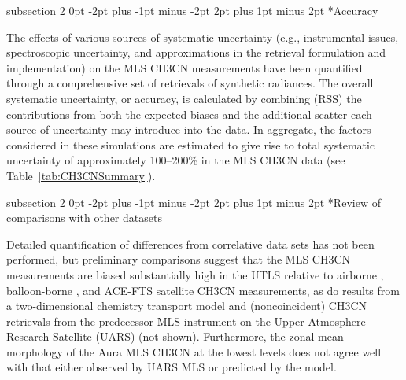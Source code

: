\documentclass[11pt,draft]{report}
\makeatletter
\renewcommand{\subsection}{\@startsection%
  {subsection}%
  {2}%
  {0pt}%
  {-2pt plus -1pt minus -2pt}%
  {2pt plus 1pt minus 2pt}%
  {\large\sffamily\fontseries{sb}\selectfont\flushleft\color{SectionColor}\figureversion{tabular}}}%
\makeatother
\begin{document}
\subsection*{Accuracy}

The effects of various sources of systematic uncertainty (e.g.,
instrumental issues, spectroscopic uncertainty, and approximations in
the retrieval formulation and implementation) on the MLS \thisv
CH\cs3CN measurements have been quantified through a comprehensive set
of retrievals of synthetic radiances.  The overall systematic
uncertainty, or accuracy, is calculated by combining (RSS) the
contributions from both the expected biases and the additional scatter
each source of uncertainty may introduce into the data. In aggregate,
the factors considered in these simulations are estimated to give rise
to total systematic uncertainty of approximately 100--200\% in the MLS
\thisv CH\cs3CN data (see Table~\ref{tab:CH3CNSummary}).

\subsection*{Review of comparisons with other datasets}

Detailed quantification of differences from correlative data sets has
not been performed, but preliminary comparisons suggest that the MLS
CH\cs3CN measurements are biased substantially high in the UTLS
relative to airborne \citep{SinghEtal03}, balloon-borne
\citep{KleinbohlEtal05}, and \mbox{ACE-FTS} satellite
\citep{HarrisonAndBernath13} CH\cs3CN measurements, as do results from
a two-dimensional chemistry transport model and (noncoincident)
CH\cs3CN retrievals from the predecessor MLS instrument on the Upper
Atmosphere Research Satellite (UARS) \citep{LiveseyEtal01} (not
shown).  Furthermore, the zonal-mean morphology of the Aura MLS
CH\cs3CN at the lowest levels does not agree well with that either
observed by UARS MLS or predicted by the model.
\end{document}
